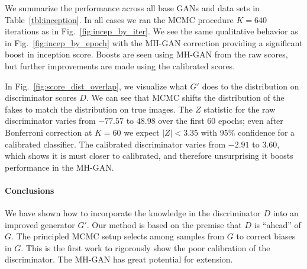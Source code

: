 \documentclass{article}
\begin{document}
We summarize the performance across all base GANs and data sets in Table~\ref{tbl:inception}.
In all cases we ran the MCMC procedure $K=640$ iterations as in Fig.~\ref{fig:incep_by_iter}.
We see the same qualitative behavior as in Fig.~\ref{fig:incep_by_epoch} with the MH-GAN correction providing a significant boost in inception score.
Boosts are seen using MH-GAN from the raw scores, but further improvements are made using the calibrated scores.

In Fig.~\ref{fig:score_dist_overlap}, we visualize what $G'$ does to the distribution on discriminator scores $D$.
We can see that MCMC shifts the distribution of the fakes to match the distribution on true images.
The $Z$ statistic for the raw discriminator varies from $-77.57$ to $48.98$ over the first 60 epochs; even after Bonferroni correction at $K=60$ we expect $|Z| < 3.35$ with 95\% confidence for a calibrated classifier.
The calibrated discriminator varies from $-2.91$ to $3.60$, which shows it is must closer to calibrated, and therefore unsurprising it boosts performance in the MH-GAN\@.

\paragraph{Conclusions}
We have shown how to incorporate the knowledge in the discriminator $D$ into an improved generator $G'$.
Our method is based on the premise that $D$ is ``ahead'' of $G$.
The principled MCMC setup selects among samples from $G$ to correct biases in $G$.
This is the first work to rigorously show the poor calibration of the discriminator.
The MH-GAN has great potential for extension.  %


\end{document}
